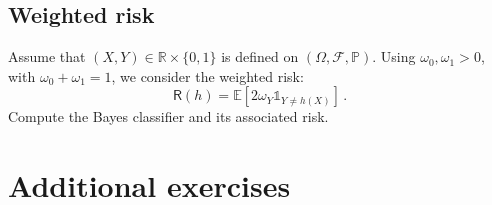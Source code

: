 \documentclass[a4paper,10pt,fleqn]{article}
\newcommand{\eqsp}{\,}
\newcommand{\bP}{\mathbb{P}}
\newcommand{\1}{\ensuremath{\mathbbm{1}}}
\newcommand{\bE}{\mathbb{E}}
\begin{document}
\subsection{Weighted risk}
Assume that $(X,Y)\in\mathbb{R}\times\{0,1\}$ is defined on $(\Omega,\mathcal{F},\mathbb{P})$. Using $\omega_0, \omega_1 >0$, with $\omega_0+\omega_1 = 1$, we  consider the weighted risk:
$$
\mathsf{R}(h) = \bE[2\omega_Y \mathds{1}_{Y\neq h(X)}]\,.
$$
Compute the Bayes classifier and its associated risk.
%
%


\section{Additional exercises}
\end{document}
